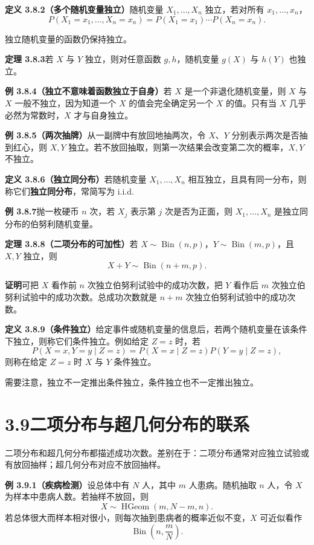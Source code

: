 \documentclass[UTF8, 12pt, fontset=fandol, oneside]{ctexart}
\begin{document}
\noindent\textbf{定义 3.8.2（多个随机变量独立）}\quad 随机变量 $X_1,\ldots,X_n$ 独立，若对所有 $x_1,\ldots,x_n$，
\[
  P(X_1=x_1,\ldots,X_n=x_n)
  =P(X_1=x_1)\cdots P(X_n=x_n).
\]

独立随机变量的函数仍保持独立。

\noindent\textbf{定理 3.8.3}\quad 若 $X$ 与 $Y$ 独立，则对任意函数 $g,h$，随机变量 $g(X)$ 与 $h(Y)$ 也独立。

\noindent\textbf{例 3.8.4（独立不意味着函数独立于自身）}\quad 若 $X$ 是一个非退化随机变量，则 $X$ 与 $X$ 一般不独立，因为知道一个 $X$ 的值会完全确定另一个 $X$ 的值。只有当 $X$ 几乎必然为常数时，$X$ 才与自身独立。

\noindent\textbf{例 3.8.5（两次抽牌）}\quad 从一副牌中有放回地抽两次，令 $X$、$Y$ 分别表示两次是否抽到红心，则 $X,Y$ 独立。若不放回抽取，则第一次结果会改变第二次的概率，$X,Y$ 不独立。

\noindent\textbf{定义 3.8.6（独立同分布）}\quad 若随机变量 $X_1,\ldots,X_n$ 相互独立，且具有同一分布，则称它们\textbf{独立同分布}，常简写为 i.i.d.

\noindent\textbf{例 3.8.7}\quad 抛一枚硬币 $n$ 次，若 $X_j$ 表示第 $j$ 次是否为正面，则 $X_1,\ldots,X_n$ 是独立同分布的伯努利随机变量。

\noindent\textbf{定理 3.8.8（二项分布的可加性）}\quad 若 $X\sim\operatorname{Bin}(n,p)$，$Y\sim\operatorname{Bin}(m,p)$，且 $X,Y$ 独立，则
\[
  X+Y\sim\operatorname{Bin}(n+m,p).
\]

\noindent\textbf{证明}\quad 可把 $X$ 看作前 $n$ 次独立伯努利试验中的成功次数，把 $Y$ 看作后 $m$ 次独立伯努利试验中的成功次数。总成功次数就是 $n+m$ 次独立伯努利试验中的成功次数。

\noindent\textbf{定义 3.8.9（条件独立）}\quad 给定事件或随机变量的信息后，若两个随机变量在该条件下独立，则称它们条件独立。例如给定 $Z=z$ 时，若
\[
  P(X=x,Y=y\mid Z=z)=P(X=x\mid Z=z)P(Y=y\mid Z=z),
\]
则称在给定 $Z=z$ 时 $X$ 与 $Y$ 条件独立。

需要注意，独立不一定推出条件独立，条件独立也不一定推出独立。

\section*{3.9\quad 二项分布与超几何分布的联系}

二项分布和超几何分布都描述成功次数。差别在于：二项分布通常对应独立试验或有放回抽样；超几何分布对应不放回抽样。

\noindent\textbf{例 3.9.1（疾病检测）}\quad 设总体中有 $N$ 人，其中 $m$ 人患病。随机抽取 $n$ 人，令 $X$ 为样本中患病人数。若抽样不放回，则
\[
  X\sim\operatorname{HGeom}(m,N-m,n).
\]
若总体很大而样本相对很小，则每次抽到患病者的概率近似不变，$X$ 可近似看作
\[
  \operatorname{Bin}\left(n,\frac{m}{N}\right).
\]
\end{document}
